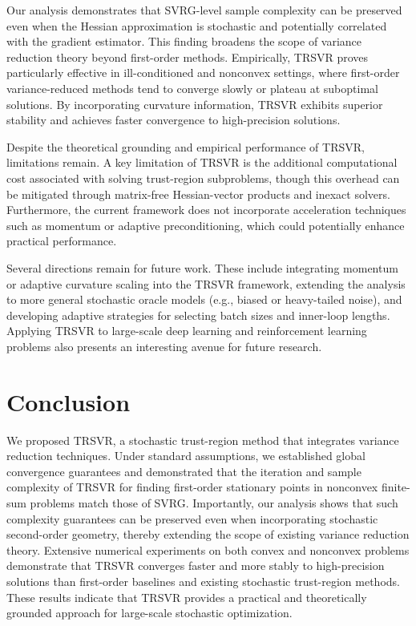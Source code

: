 \documentclass{article}
\theoremstyle{plain}
\theoremstyle{definition}
\theoremstyle{remark}
\begin{document}
Our analysis demonstrates that SVRG-level sample complexity can be preserved even when the Hessian approximation is stochastic and potentially correlated with the gradient estimator. This finding broadens the scope of variance reduction theory beyond first-order methods. Empirically, TRSVR proves particularly effective in ill-conditioned and nonconvex settings, where first-order variance-reduced methods tend to converge slowly or plateau at suboptimal solutions. By incorporating curvature information, TRSVR exhibits superior stability and achieves faster convergence to high-precision solutions.


Despite the theoretical grounding and empirical performance of TRSVR, limitations remain.
A key limitation of TRSVR is the additional computational cost associated with solving trust-region subproblems, though this overhead can be mitigated through matrix-free Hessian-vector products and inexact solvers. Furthermore, the current framework does not incorporate acceleration techniques such as momentum or adaptive preconditioning, which could potentially enhance practical performance.

Several directions remain for future work. These include integrating momentum or adaptive curvature scaling into the TRSVR framework, extending the analysis to more general stochastic oracle models (e.g., biased or heavy-tailed noise), and developing adaptive strategies for selecting batch sizes and inner-loop lengths. Applying TRSVR to large-scale deep learning and reinforcement learning problems also presents an interesting avenue for future research.

\section{Conclusion}
We proposed TRSVR, a stochastic trust-region method that integrates variance reduction techniques. Under standard assumptions, we established global convergence guarantees and demonstrated that the iteration and sample complexity of TRSVR for finding first-order stationary points in nonconvex finite-sum problems match those of SVRG. Importantly, our analysis shows that such complexity guarantees can be preserved even when incorporating stochastic second-order geometry, thereby extending the scope of existing variance reduction theory. Extensive numerical experiments on both convex and nonconvex problems demonstrate that TRSVR converges faster and more stably to high-precision solutions than first-order baselines and existing stochastic trust-region methods. These results indicate that TRSVR provides a practical and theoretically grounded approach for large-scale stochastic optimization.
\end{document}

